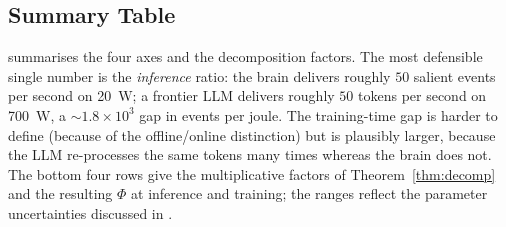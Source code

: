 \documentclass[11pt]{article}
\providecommand{\watt}{\ensuremath{\mathrm{W}}}
\theoremstyle{definition}
\theoremstyle{remark}
\begin{document}
\subsection{Summary Table}

 summarises the four axes and the decomposition
factors.  The most defensible single number is the \emph{inference}
ratio: the brain delivers roughly $50$ salient events per second on
\SI{20}{\watt}; a frontier LLM delivers roughly $50$ tokens per
second on \SI{700}{\watt}, a $\sim 1.8\times 10^{3}$ gap in events
per joule.  The training-time gap is harder to define (because of
the offline/online distinction) but is plausibly larger, because the
LLM re-processes the same tokens many times whereas the brain does
not.  The bottom four rows give the multiplicative factors of
Theorem~\ref{thm:decomp} and the resulting $\Phi$ at inference and
training; the ranges reflect the parameter uncertainties discussed
in .
\end{document}
